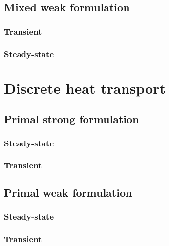 \documentclass{article}
\theoremstyle{definition}
\begin{document}
\subsection{Mixed weak formulation}
\subsubsection{Transient}


\subsubsection{Steady-state}


\section{Discrete heat transport}
\label{section:discrete_diffusion}



\subsection{Primal strong formulation}
\subsubsection{Steady-state}

\subsubsection{Transient}


\subsection{Primal weak formulation}
\subsubsection{Steady-state}


\subsubsection{Transient}



\end{document}

